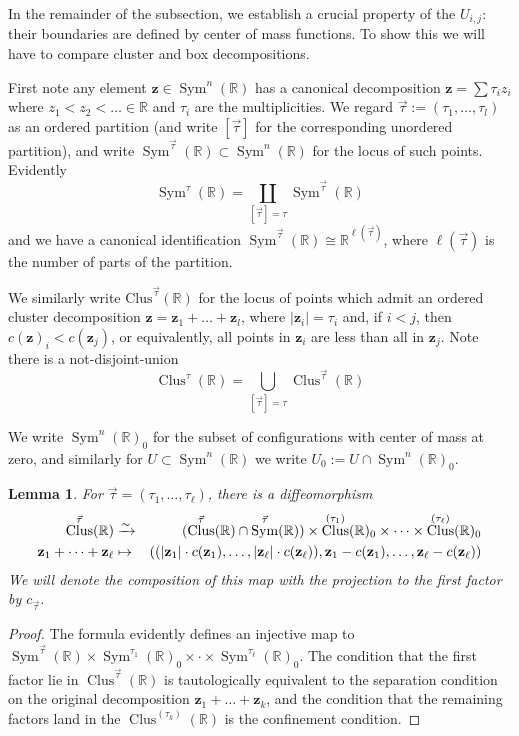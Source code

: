 \documentclass{article}
\def\R{\mathbb{R}}
\DeclareMathOperator{\Sym}{Sym}
\DeclareMathOperator{\Clus}{Clus}
\newtheorem{lemma}[theorem]{Lemma}
\theoremstyle{definition}
\begin{document}
In the remainder of the subsection, we establish a crucial property of the $U_{i,j}$: their boundaries are defined by center of mass functions.
To show this we will have to compare cluster and box decompositions. 


First note any element $\mathbf{z} \in \Sym^n (\R)$ has a canonical decomposition $\mathbf{z} = \sum \tau_i z_i$ where $z_1 < z_2 < \ldots \in \R$ and $\tau_i$ are the multiplicities.  We regard $\vec\tau := (\tau_1, \ldots, \tau_l)$ as an ordered partition (and write $[\vec \tau]$ for the corresponding unordered partition), and write $\Sym^{\vec \tau}(\R) \subset \Sym^n(\R)$ for the locus of such points.  Evidently  
$$\Sym^{\tau}(\R) = \coprod_{[\vec \tau] = \tau} \Sym^{\vec{\tau}}(\R)$$
and we have a canonical identification $\Sym^{\vec \tau}(\R) \cong \R^{\ell(\vec \tau)}$, where $\ell(\vec \tau)$ is the number of parts of the partition.

We similarly write  $\mathrm{Clus}^{\vec \tau}(\R)$ for the locus of points which admit an ordered cluster decomposition $\mathbf{z} = \mathbf{z}_1 + \ldots + \mathbf{z}_l$, where $|\mathbf{z}_i| = \tau_i$ and, if $i < j$, then $c(\mathbf{z})_i < c(\mathbf{z}_j)$, or equivalently, all points in $\mathbf{z}_i$ are less than all in $\mathbf{z}_j$.  Note  there is a not-disjoint-union  
\begin{equation}\label{clus R to sym R}\Clus^{\tau}(\R) = \bigcup_{[\vec \tau] = \tau} \Clus^{\vec{\tau}}(\R)
\end{equation}

We write $\Sym^n (\R)_0$ for the subset of configurations with center of mass at zero, and similarly for $U \subset \Sym^n(\R)$ we write $U_0:= U \cap \Sym^n(\R)_0$. 


\begin{lemma} 
For $\vec{\tau} = (\tau_1, \ldots, \tau_\ell)$,
there is a diffeomorphism 
\begin{eqnarray}
\label{product structure clus R}\Clus^{\vec{\tau}}(\R) & \xrightarrow{\sim} & (\Clus^{\vec{\tau}}(\R) \cap \Sym^{\vec{\tau}}(\R) ) \times \Clus^{(\tau_1)}(\R)_0 \times \cdots \times \Clus^{(\tau_\ell)}(\R)_0 \\
\notag \mathbf{z}_1 + \cdots + \mathbf{z_{\ell}} & \mapsto & ((|\mathbf{z}_1|\cdot c(\mathbf{z}_1), \ldots, |\mathbf{z}_\ell|\cdot  c(\mathbf{z}_\ell)), \mathbf{z}_1 - c(\mathbf{z}_1), \ldots, \mathbf{z}_\ell - c(\mathbf{z}_\ell))
\end{eqnarray}
We will denote the composition of this map with the projection to the first factor by $c_{\vec \tau}$. 
\end{lemma}
\begin{proof}
    The formula evidently defines an injective map to $\Sym^{\vec{\tau}}(\R) \times \Sym^{\tau_1}(\R)_0 \times \cdot \times \Sym^{\tau_\ell}(\R)_0$.  The condition that the first factor lie in $\Clus^{\vec{\tau}}(\R)$ is tautologically equivalent to the separation condition on the original decomposition $\mathbf{z}_1 + \ldots + \mathbf{z}_k$, and the condition that the remaining factors land in the $\Clus^{(\tau_k)}(\R)$ is the confinement condition.
\end{proof}
\end{document}
